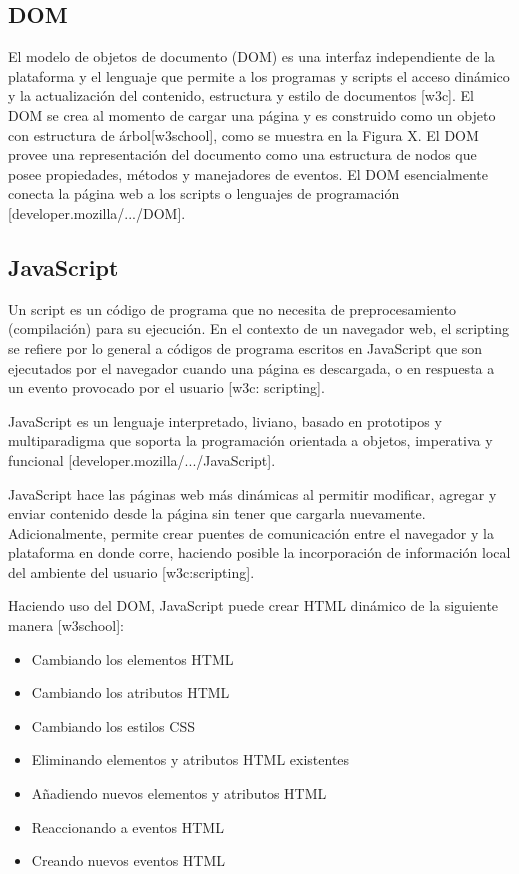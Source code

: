 \subsection{DOM}


El modelo de objetos de documento (DOM) es una interfaz independiente de la plataforma y el lenguaje que permite a los programas y scripts el acceso dinámico y la actualización del contenido, estructura y estilo de documentos [w3c]. El DOM se crea al momento de cargar una página y es construido como un objeto con estructura de árbol[w3school], como se muestra en la Figura X. El DOM provee una representación del documento como una estructura de nodos que posee propiedades, métodos y manejadores de eventos. El DOM esencialmente conecta la página web a los scripts o lenguajes de programación [developer.mozilla/.../DOM].


\subsection{JavaScript}

Un script es un código de programa que no necesita de preprocesamiento (compilación) para su ejecución. En el contexto de un navegador web, el scripting se refiere por lo general a códigos de programa escritos en JavaScript que son ejecutados por el navegador cuando una página es descargada, o en respuesta a un evento provocado por el usuario [w3c: scripting].

JavaScript es un lenguaje interpretado, liviano, basado en prototipos y multiparadigma que soporta la programación orientada a objetos, imperativa y funcional [developer.mozilla/.../JavaScript]. 

JavaScript hace las páginas web más dinámicas al permitir modificar, agregar y enviar contenido desde la página sin tener que cargarla nuevamente. Adicionalmente, permite crear puentes de comunicación entre el navegador y la plataforma en donde corre, haciendo posible la incorporación de información local del ambiente del usuario [w3c:scripting].

Haciendo uso del DOM, JavaScript puede crear HTML dinámico de la siguiente manera [w3school]:

\begin{itemize}
  \item Cambiando los elementos HTML
  \item Cambiando los atributos HTML 
  \item Cambiando los estilos CSS 
  \item Eliminando elementos y atributos HTML existentes
  \item Añadiendo nuevos elementos y atributos HTML
  \item Reaccionando a eventos HTML 
  \item Creando nuevos eventos HTML
\end{itemize}

